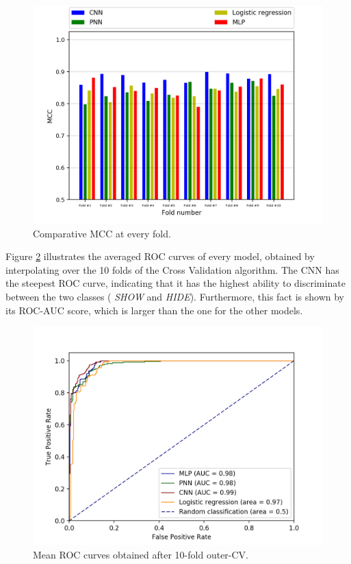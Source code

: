 		\begin{figure}[H]
			\centering
			\includegraphics[width=\textwidth]{graphics/MCC-per-fold}
			\caption{Comparative MCC at every fold.}
			\label{Fig: eval/ml/results/MCC-per-fold}
		\end{figure}
		Figure \ref{Fig: eval/ml/results/ROC} illustrates the averaged ROC curves of every model, obtained by interpolating over the 10 folds of the Cross Validation algorithm. The CNN has the steepest ROC curve, indicating that it has the highest ability to discriminate between the two classes ( \textit{SHOW} and \textit{HIDE}). Furthermore, this fact is shown by its ROC-AUC score, which is larger than the one for the other models.
		\begin{figure}[H]
			\centering
			\includegraphics[width=\textwidth]{graphics/ROC-curve}
			\caption{Mean ROC curves obtained after 10-fold outer-CV.}
			\label{Fig: eval/ml/results/ROC}
		\end{figure}
